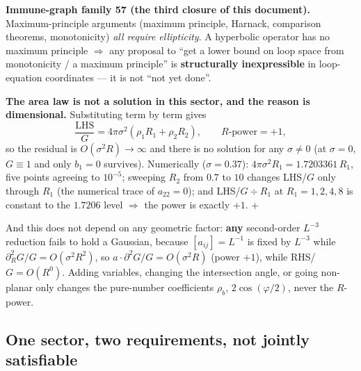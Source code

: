\begin{keybox}
\textbf{Immune-graph family 57 (the third closure of this document).} Maximum-principle arguments
(maximum principle, Harnack, comparison theorems, monotonicity) \emph{all require ellipticity}. A
hyperbolic operator has no maximum principle $\Rightarrow$ any proposal to ``get a lower bound on loop
space from monotonicity / a maximum principle'' is \textbf{structurally inexpressible} in loop-equation
coordinates --- it is not ``not yet done''. \LN
\end{keybox}

\noindent
\textbf{The area law is not a solution in this sector, and the reason is dimensional.} Substituting
term by term gives
\begin{equation}
  \frac{\text{LHS}}{G}=4\pi\sigma^{2}(\rho_1R_1+\rho_2R_2),
  \qquad R\text{-power} = +1 ,
\end{equation}
so the residual is $O(\sigma^{2}R)\to\infty$ and there is no solution for any $\sigma\neq0$ (at
$\sigma=0$, $G\equiv1$ and only $b_1=0$ survives). Numerically ($\sigma=0.37$):
$4\pi\sigma^{2}R_1=1.7203361\,R_1$, five points agreeing to $10^{-5}$; sweeping $R_2$ from $0.7$ to
$10$ changes LHS/$G$ only through $R_1$ (the numerical trace of $a_{22}=0$); and
LHS/$G\div R_1$ at $R_1=1,2,4,8$ is constant to the $1.7206$ level $\Rightarrow$ the power is exactly
$+1$. \LT+\LE
{}

\noindent
And this does not depend on any geometric factor: \textbf{any} second-order $L^{-3}$ reduction fails to
hold a Gaussian, because $[a_{ij}]=L^{-1}$ is fixed by $L^{-3}$ while
$\partial^{2}_RG/G=O(\sigma^{2}R^{2})$, so $a\cdot\partial^{2}G/G=O(\sigma^{2}R)$ (power $+1$), while
RHS/$G=O(R^{0})$. Adding variables, changing the intersection angle, or going non-planar only changes
the pure-number coefficients $\rho_b$, $2\cos(\varphi/2)$, never the $R$-power. \LT
{}

\subsection{One sector, two requirements, not jointly satisfiable}

